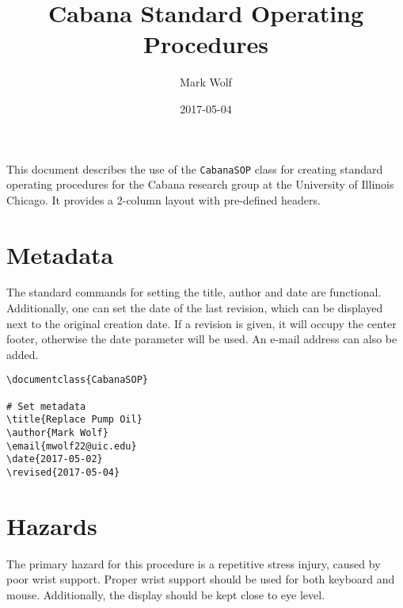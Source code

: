 \documentclass{CabanaSOP}
\title{Cabana Standard Operating Procedures}
\author{Mark Wolf}
\date{2017-05-04}
\begin{document}
\maketitle

This document describes the use of the \texttt{CabanaSOP} class for
creating standard operating procedures for the Cabana research group
at the University of Illinois Chicago. It provides a 2-column layout
with pre-defined headers.

\section*{Metadata}

The standard commands for setting the title, author and date are
functional. Additionally, one can set the date of the last revision,
which can be displayed next to the original creation date. If a
revision is given, it will occupy the center footer, otherwise the
date parameter will be used. An e-mail address can also be added.

\begin{verbatim}
\documentclass{CabanaSOP}

# Set metadata
\title{Replace Pump Oil}
\author{Mark Wolf}
\email{mwolf22@uic.edu}
\date{2017-05-02}
\revised{2017-05-04}
\end{verbatim}

\section*{Hazards}
The primary hazard for this procedure is a repetitive stress injury,
caused by poor wrist support. Proper wrist support should be used for
both keyboard and mouse. Additionally, the display should be kept
close to eye level.
\end{document}

